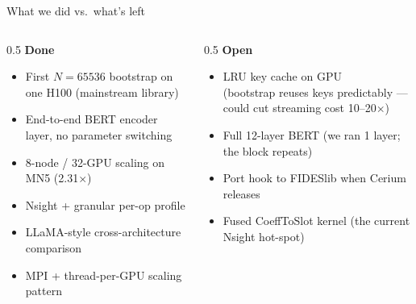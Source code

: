 \documentclass[aspectratio=169]{beamer}
\begin{document}
\begin{frame}{What we did vs.\ what's left}
  \begin{columns}[T]
    \begin{column}{0.5\textwidth}
      \textbf{\color{gpuGreen}Done}
      \begin{itemize}\small
        \item First $N{=}65536$ bootstrap on one H100 (mainstream library)
        \item End-to-end BERT encoder layer, no parameter switching
        \item 8-node / 32-GPU scaling on MN5 (2.31$\times$)
        \item Nsight + granular per-op profile
        \item LLaMA-style cross-architecture comparison
        \item MPI + thread-per-GPU scaling pattern
      \end{itemize}
    \end{column}
    \begin{column}{0.5\textwidth}
      \textbf{\color{accentRed}Open}
      \begin{itemize}\small
        \item LRU key cache on GPU\\
              \footnotesize(bootstrap reuses keys predictably — could cut streaming
              cost 10--20$\times$)
        \normalsize
        \item Full 12-layer BERT (we ran 1 layer;
              the block repeats)
        \item Port hook to FIDESlib when Cerium releases
        \item Fused CoeffToSlot kernel (the current Nsight hot-spot)
      \end{itemize}
    \end{column}
  \end{columns}
\end{frame}
\end{document}
